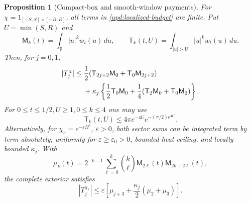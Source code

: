 \documentclass[11pt]{article}
\numberwithin{equation}{section}
\newtheorem{proposition}[theorem]{Proposition}
\theoremstyle{definition}
\theoremstyle{remark}
\newcommand{\R}{\mathbb R}
\newcommand{\dd}{\,d}
\begin{document}
\begin{proposition}[Compact-box and smooth-window payments]
\label{upd:localization}
For $\chi=1_{[-S,S]\times[-R,R]}$, all terms in
\eqref{upd:localized-budget} are finite. Put $U=\min(S,R)$ and
\[
 \mathsf M_k(t)=\int_{\R}|u|^kw_t(u)\dd u,\qquad
 \mathsf T_k(t,U)=\int_{|u|>U}|u|^kw_t(u)\dd u.
\]
Then, for $j=0,1$,
\begin{align}
 |T_j^\chi|\le{}&\frac12(\mathsf T_{2j+2}\mathsf M_0+
                                  \mathsf T_0\mathsf M_{2j+2})\notag\\
 &+\kappa_j\left\{\frac12\mathsf T_0\mathsf M_0+
              \frac14(\mathsf T_2\mathsf M_0+\mathsf T_0\mathsf M_2)
                    \right\}.\label{upd:box-tail}
\end{align}
For $0\le t\le1/2,U\ge1,0\le k\le4$ one may use
\begin{equation}
 \mathsf T_k(t,U)\le4\pi e^{-4U}
                              e^{-(\pi/2)e^{4U}}.\label{upd:box-tail-bound}
\end{equation}
Alternatively, for $\chi_\varepsilon=e^{-\varepsilon\Omega^2}$,
$\varepsilon>0$, both sector sums can be integrated term by term
absolutely, uniformly for $\varepsilon\ge\varepsilon_0>0$, bounded
heat ceiling, and locally bounded $\kappa_j$. With
\[
 \mu_k(t)=2^{-k-1}\sum_{\ell=0}^{k}\binom{k}{\ell}
                   \mathsf M_{2\ell}(t)\mathsf M_{2k-2\ell}(t),
\]
the complete exterior satisfies
\begin{equation}
 |T_j^{\chi_\varepsilon}|\le\varepsilon\left[
 \mu_{j+3}+\frac{\kappa_j}{2}(\mu_2+\mu_3)\right].
 \label{upd:smooth-tail}
\end{equation}
\end{proposition}
\end{document}
